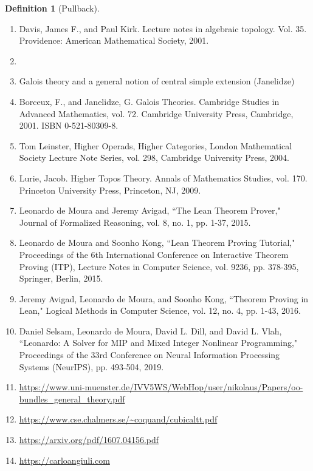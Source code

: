 \documentclass{book}
\theoremstyle{definition}
\newtheorem{definition}{Definition}
\begin{document}
\begin{definition}[Pullback]
\begin{enumerate}
\item Davis, James F., and Paul Kirk. Lecture notes in algebraic topology. Vol. 35. Providence: American Mathematical Society, 2001.
\item 
\item Galois theory and a general notion of central simple extension (Janelidze) 
\item Borceux, F., and Janelidze, G. Galois Theories. Cambridge Studies in Advanced Mathematics, vol. 72. Cambridge University Press, Cambridge, 2001. ISBN 0-521-80309-8.
\item Tom Leinster, Higher Operads, Higher Categories, London Mathematical Society Lecture Note Series, vol. 298, Cambridge University Press, 2004.
\item Lurie, Jacob. Higher Topos Theory. Annals of Mathematics Studies, vol. 170. Princeton University Press, Princeton, NJ, 2009.
\item Leonardo de Moura and Jeremy Avigad, ``The Lean Theorem Prover," Journal of Formalized Reasoning, vol. 8, no. 1, pp. 1-37, 2015.
\item Leonardo de Moura and Soonho Kong, ``Lean Theorem Proving Tutorial," Proceedings of the 6th International Conference on Interactive Theorem Proving (ITP), Lecture Notes in Computer Science, vol. 9236, pp. 378-395, Springer, Berlin, 2015.
\item Jeremy Avigad, Leonardo de Moura, and Soonho Kong, ``Theorem Proving in Lean," Logical Methods in Computer Science, vol. 12, no. 4, pp. 1-43, 2016.
\item Daniel Selsam, Leonardo de Moura, David L. Dill, and David L. Vlah, ``Leonardo: A Solver for MIP and Mixed Integer Nonlinear Programming," Proceedings of the 33rd Conference on Neural Information Processing Systems (NeurIPS), pp. 493-504, 2019.
\item \url{https://www.uni-muenster.de/IVV5WS/WebHop/user/nikolaus/Papers/oo-bundles_general_theory.pdf}
\item \url{https://www.cse.chalmers.se/~coquand/cubicaltt.pdf}
\item \url{https://arxiv.org/pdf/1607.04156.pdf}
\item \url{https://carloangiuli.com}
\end{enumerate}


\end{definition}
\end{document}

